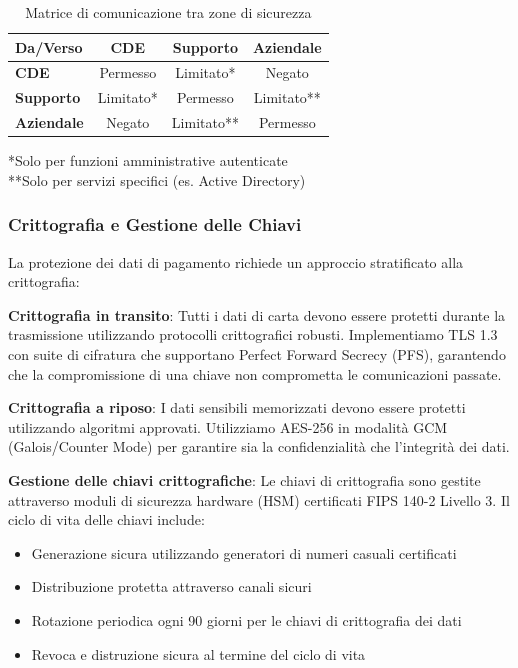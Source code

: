 \begin{table}[htbp]
\centering
\caption{Matrice di comunicazione tra zone di sicurezza}
\label{tab:matrice_comunicazione}
\small
\sffamily
\begin{tabularx}{\textwidth}{X c c c}
\toprule
\textbf{Da/Verso} & \textbf{CDE} & \textbf{Supporto} & \textbf{Aziendale} \\
\midrule
\textbf{CDE} & Permesso & Limitato* & Negato \\
\textbf{Supporto} & Limitato* & Permesso & Limitato** \\
\textbf{Aziendale} & Negato & Limitato** & Permesso \\
\bottomrule
\end{tabularx}
\vspace{0.5cm}
\small{*Solo per funzioni amministrative autenticate\\
**Solo per servizi specifici (es. Active Directory)}
\end{table}

\subsubsection{\texorpdfstring{Crittografia e Gestione delle Chiavi}{4.4.1.2 - Crittografia e Gestione delle Chiavi}}

La protezione dei dati di pagamento richiede un approccio stratificato alla crittografia:

\textbf{Crittografia in transito}: Tutti i dati di carta devono essere protetti durante la trasmissione utilizzando protocolli crittografici robusti. Implementiamo TLS 1.3 con suite di cifratura che supportano Perfect Forward Secrecy (PFS), garantendo che la compromissione di una chiave non comprometta le comunicazioni passate.

\textbf{Crittografia a riposo}: I dati sensibili memorizzati devono essere protetti utilizzando algoritmi approvati. Utilizziamo AES-256 in modalità GCM (Galois/Counter Mode) per garantire sia la confidenzialità che l'integrità dei dati.

\textbf{Gestione delle chiavi crittografiche}: Le chiavi di crittografia sono gestite attraverso moduli di sicurezza hardware (HSM) certificati FIPS 140-2 Livello 3. Il ciclo di vita delle chiavi include:
\begin{itemize}
    \item Generazione sicura utilizzando generatori di numeri casuali certificati
    \item Distribuzione protetta attraverso canali sicuri
    \item Rotazione periodica ogni 90 giorni per le chiavi di crittografia dei dati
    \item Revoca e distruzione sicura al termine del ciclo di vita
\end{itemize}

